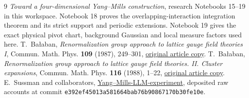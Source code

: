 \begin{thebibliography}{9}
\emph{Toward a four-dimensional Yang--Mills construction},
research Notebooks 15--19 in this workspace.
Notebook 18 proves the overlapping-interaction integration
theorem and its strict support and periodic extensions.
Notebook 19 gives the exact physical pivot chart, background
Gaussian and local measure factors used here.
T.~Ba\l aban,
\emph{Renormalization group approach to lattice gauge field
theories I}, Commun. Math. Phys. \textbf{109} (1987), 249--301,
\href{https://scispace.com/pdf/renormalization-group-approach-to-lattice-gauge-field-3ygai0vxt1.pdf}{original article copy}.
T.~Ba\l aban,
\emph{Renormalization group approach to lattice gauge field
theories. II. Cluster expansions},
Commun. Math. Phys. \textbf{116} (1988), 1--22,
\href{https://scispace.com/pdf/renormalization-group-approach-to-lattice-gauge-field-4penm4k7hc.pdf}{original article copy}.
E.~Sussman and collaborators,
\href{https://github.com/ethanwsussman/Yang--Mills-LLM-experiment}{Yang--Mills-LLM-experiment},
deposited raw accounts at commit
\texttt{e392ef45013a581664bab76b90867170b30fe10e}.
\end{thebibliography}

